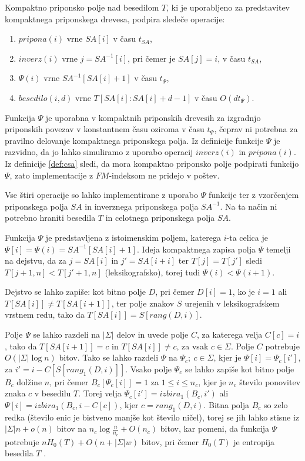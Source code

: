 \begin{defi}\label{def:csa}
     Kompaktno priponsko polje nad besedilom $T$, ki je uporabljeno za predstavitev kompaktnega priponskega drevesa, podpira sledeče operacije:
    \begin{enumerate}
        \item $pripona(i)$ vrne $SA[i]$ v času $t_{SA}$,
        \item $inverz(i)$ vrne $j=SA^{-1}[i]$, pri čemer je $SA[j]=i$, v času $t_{SA}$,
        \item $\Psi(i)$ vrne $SA^{-1}[SA[i]+1]$ v času $t_\Psi$,
        \item $besedilo(i,d)$ vrne $T[SA[i]:SA[i]+d-1]$ v času $O(dt_\Psi)$.
    \end{enumerate}    
\end{defi}

Funkcija $\Psi$ je uporabna v kompaktnih priponskih drevesih za izgradnjo priponskih povezav v konstantnem času oziroma v času $t_\Psi$, čeprav ni potrebna za pravilno delovanje kompaktnega priponskega polja. Iz definicije funkcije $\Psi$ je razvidno, da jo lahko simuliramo z uporabo operacij $inverz(i)$ in $pripona(i)$. Iz definicije \ref{def:csa} sledi, da mora kompaktno priponsko polje podpirati funkcijo $\Psi$, zato implementacije z $FM$-indeksom ne pridejo v poštev. 

Vse štiri operacije so lahko implementirane z uporabo $\Psi$ funkcije ter z vzorčenjem priponskega polja $SA$ in inverznega priponskega polja $SA^{-1}$. Na ta način ni potrebno hraniti besedila $T$ in celotnega priponskega polja $SA$.

Funkcija $\Psi$ je predstavljena z istoimenskim poljem, katerega $i$-ta celica je $\Psi[i]=\Psi(i)=SA^{-1}[SA[i]+1]$. Ideja kompaktnega zapisa polja $\Psi$ temelji na dejstvu, da za $j=SA[i]$ in $j'=SA[i+i]$ ter $T[j]=T[j']$ sledi $T[j+1,n]<T[j'+1,n]$ (leksikografsko), torej tudi $\Psi(i)<\Psi(i+1)$. 

Dejstvo se lahko zapiše: kot bitno polje $D$, pri čemer $D[i]=1$, ko je $i=1$ ali $T[SA[i]]\ne T[SA[i+1]]$, ter polje znakov $S$ urejenih v leksikografskem vrstnem redu, tako da $T[SA[i]]=S[rang(D,i)]$.

Polje $\Psi$ se lahko razdeli na $|\Sigma|$ delov in uvede polje $C$, za katerega velja $C[c]=i$, tako da $T[SA[i+1]]=c$ in $T[SA[i]]\ne c$, za vsak $c\in\Sigma$. Polje $C$ potrebuje $O(|\Sigma|\log{n})$ bitov. Tako se lahko razdeli $\Psi$ na $\Psi_c;\:c\in\Sigma$, kjer je $\Psi[i]=\Psi_c[i']$,  za $i'=i-C[S[rang_1(D,i)]]$. Vsako polje $\Psi_c$ se lahko zapiše kot bitno polje $B_c$ dolžine $n$, pri čemer $B_c[\Psi_c[i]]=1$ za $1 \le i \le n_c$, kjer je $n_c$ število ponovitev znaka $c$ v besedilu $T$. Torej velja $\Psi_c[i']=izbira_1(B_c,i')$ ali $\Psi[i]=izbira_1(B_c,i-C[c])$, kjer $c=rang_1(D,i)$. Bitna polja $B_c$ so zelo redka (število enic je bistveno manjše kot število ničel), torej se jih lahko stisne iz $|\Sigma|n+o(n)$ bitov na $n_c\log\frac{n}{n_c}+O(n_c)$ bitov, kar pomeni, da funkcija $\Psi$ potrebuje $nH_0(T)+O(n+|\Sigma|w)$ bitov, pri čemer $H_0(T)$ je entropija besedila $T$ \cite{Navarro2016}.

